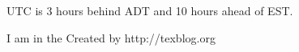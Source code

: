 \documentclass{article}
\begin{document}
UTC  is 3  hours behind
ADT and  10 hours  ahead of
EST.

I   am    in   the   \printnomenclature   \small\hfill    Created   by
http://texblog.org
\end{document}
